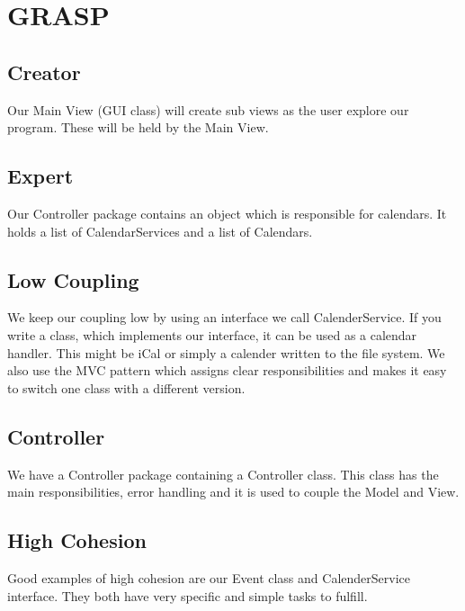\section{GRASP}
\subsection{Creator}
Our Main View (GUI class) will create sub views as the user explore our program. These will be held by the Main View.

\subsection{Expert}
Our Controller package contains an object which is responsible for calendars. It holds a list of CalendarServices and a list of Calendars.

\subsection{Low Coupling}
We keep our coupling low by using an interface we call CalenderService. If you write a class, which implements our interface, it can be used as a calendar handler. This might be iCal or simply a calender written to the file system. 
We also use the MVC pattern which assigns clear responsibilities and makes it easy to switch one class with a different version.

\subsection{Controller}
We have a Controller package containing a Controller class. This class has the main responsibilities, error handling and it is used to couple the Model and View.

\subsection{High Cohesion}
Good examples of high cohesion are our Event class and CalenderService interface. They both have very specific and simple tasks to fulfill. 

\newpage